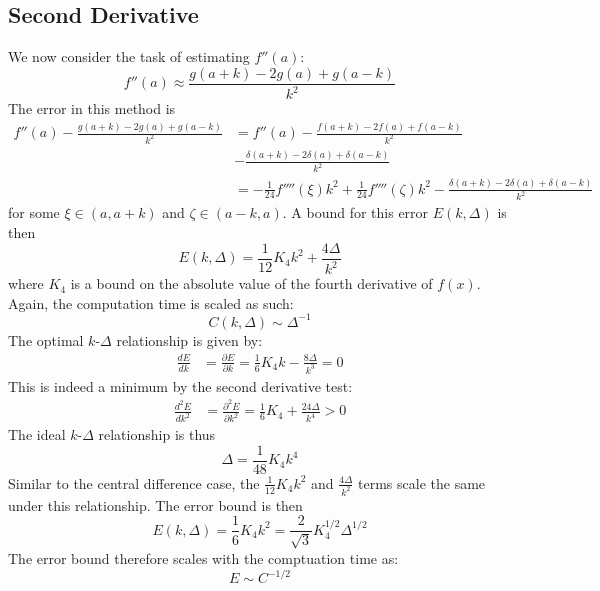 \documentclass[letterpaper,11pt]{article}
\newcommand*{\deriv}[2]{\frac{d #1}{d #2}}
\newcommand*{\pderiv}[2]{\frac{\partial #1}{\partial #2}}
\newcommand*{\nderiv}[3]{\frac{d^{#3} #1}{d #2^{#3}}}
\newcommand*{\npderiv}[3]{\frac{\partial^{#3} #1}{\partial #2^{#3}}}
\begin{document}
\begin{flushleft}
    \subsection{Second Derivative}
    We now consider the task of estimating $f''(a)$:
    $$f''(a) \approx \frac{g(a+k) - 2g(a) + g(a-k)}{k^2}$$
    The error in this method is
    \begin{align*}
        f''(a) - \frac{g(a+k) - 2g(a) + g(a-k)}{k^2} &= f''(a) - \frac{f(a+k) - 2f(a) + f(a-k)}{k^2} \\ &- \frac{\delta(a+k) - 2\delta(a) + \delta(a-k)}{k^2} \\
        &= -\frac{1}{24}f''''(\xi)k^2 + \frac{1}{24}f''''(\zeta)k^2 - \frac{\delta(a+k) - 2\delta(a) + \delta(a-k)}{k^2}
    \end{align*}
    for some $\xi \in (a, a+k)$ and $\zeta \in (a-k, a)$. A bound for this error $E(k, \Delta)$ is then
    $$E(k, \Delta) = \frac{1}{12}K_4k^2 + \frac{4\Delta}{k^2}$$
    where $K_4$ is a bound on the absolute value of the fourth derivative of $f(x)$. Again, the computation time is scaled as such:
    $$\boxed{C(k, \Delta) \sim \Delta^{-1}}$$
    The optimal $k$-$\Delta$ relationship is given by:
    \begin{align*}
        \deriv{E}{k} &= \pderiv{E}{k} = \frac{1}{6}K_4k - \frac{8\Delta}{k^3} = 0
    \end{align*}
    This is indeed a minimum by the second derivative test:
    \begin{align*}
        \nderiv{E}{k}{2} &= \npderiv{E}{k}{2} = \frac{1}{6}K_4 + \frac{24\Delta}{k^4} > 0
    \end{align*}
    The ideal $k$-$\Delta$ relationship is thus
    $$\boxed{\Delta = \frac{1}{48}K_4k^4}$$
    Similar to the central difference case, the $\frac{1}{12}K_4k^2$ and $\frac{4\Delta}{k^2}$ terms scale the same under this relationship. The error bound is then
    $$\boxed{E(k, \Delta) = \frac{1}{6}K_4k^2 = \frac{2}{\sqrt{3}}K_4^{1/2}\Delta^{1/2}}$$
    The error bound therefore scales with the comptuation time as:
    $$\boxed{E \sim C^{-1/2}}$$

\end{flushleft}
\end{document}
